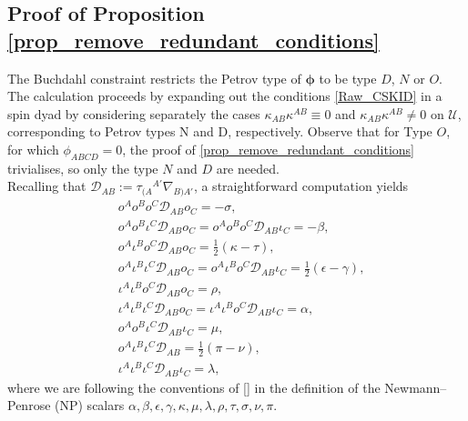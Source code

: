 \documentclass[10pt,a4paper]{article}
\theoremstyle{plain}
\begin{document}



\subsection{Proof of Proposition \ref{prop_remove_redundant_conditions}}
\label{Sec:ProofOfProp3}

The Buchdahl constraint restricts the Petrov type of
$\bm\phi$ to be type $D$, $N$ or $O$.
The calculation proceeds by expanding out the
conditions \eqref{Raw_CSKID} in a spin dyad
by considering separately the cases $\kappa_{AB}\kappa^{AB}\equiv 0$
and $\kappa_{AB}\kappa^{AB}\neq 0$ on $\mathcal{U}$, corresponding to Petrov types N and D, respectively.
Observe that for Type $O$, for which $\phi_{ABCD}=0$,
the proof of \ref{prop_remove_redundant_conditions} trivialises,
so only the type $N$ and $D$ are needed.
\\

Recalling that $\mathcal{D}_{AB}:= \tau_{(A}{}^{A'}\nabla_{B)A'}$, a straightforward computation yields 
\begin{align*}
& o^Ao^Bo^C\mathcal{D}_{AB}o_C = -\sigma,\\
& o^Ao^B\iota^C\mathcal{D}_{AB}o_C=o^Ao^Bo^C\mathcal{D}_{AB}\iota_C=-\beta,\\
& o^A\iota^B o^C\mathcal{D}_{AB}o_C = \tfrac{1}{2}(\kappa - \tau),\\
& o^A\iota^B\iota^C\mathcal{D}_{AB}o_C = o^A\iota^B o^C\mathcal{D}_{AB}\iota_C = \tfrac{1}{2}(\epsilon - \gamma),\\
& \iota^A\iota^B o^C\mathcal{D}_{AB}o_C = \rho,\\
& \iota^A\iota^B\iota^C\mathcal{D}_{AB}o_C = \iota^A\iota^B o^C\mathcal{D}_{AB}\iota_C = \alpha,\\
& o^A o^B\iota^C\mathcal{D}_{AB}\iota_C = \mu,\\
& o^A\iota^B\iota^C\mathcal{D}_{AB} = \tfrac{1}{2}(\pi - \nu),\\
& \iota^A\iota^B\iota^C\mathcal{D}_{AB}\iota_C = \lambda	,
\end{align*}
where we are following the conventions of [] in the definition of the Newmann--Penrose (NP) scalars $\alpha, \beta, \epsilon, \gamma, \kappa, \mu, 
\lambda, \rho, \tau, \sigma, \nu, \pi.$
\\
\end{document}
